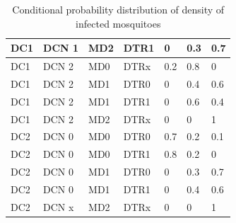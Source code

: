 \documentclass[review]{elsarticle}
\begin{document}
\begin{table}[!htbp]
\begin{tabular}{|l|l|l|l|l|l|l|}
			\hline
			DC1 & DCN 1 & MD2 & DTR1 & 0 & 0.3 & 0.7\\
			\hline
			DC1 & DCN 2 & MD0 & DTRx & 0.2 & 0.8 & 0\\
			\hline
			DC1 & DCN 2 & MD1 & DTR0 & 0 & 0.4 & 0.6\\
			\hline
			DC1 & DCN 2 & MD1 & DTR1 & 0 & 0.6 & 0.4\\
			\hline
			DC1 & DCN 2 & MD2 & DTRx & 0 & 0 & 1\\
			\hline
			DC2 & DCN 0 & MD0 & DTR0 & 0.7 & 0.2 & 0.1\\
			\hline
			DC2 & DCN 0 & MD0 & DTR1 & 0.8 & 0.2 & 0\\
			\hline
			DC2 & DCN 0 & MD1 & DTR0 & 0 & 0.3 & 0.7\\
			\hline
			DC2 & DCN 0 & MD1 & DTR1 & 0 & 0.4 & 0.6\\
			\hline
			DC2 & DCN x & MD2 & DTRx & 0 & 0 & 1\\
			\hline
		\end{tabular}
		\caption{Conditional probability distribution of density of infected mosquitoes}
		\label{condition-idm}
	\end{table}
\end{document}
